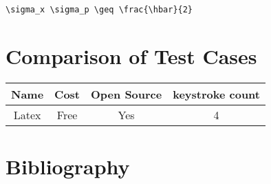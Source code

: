 \documentclass{article}
\begin{document}
\begin{multicols}{2}
\begin{verbatim}
\sigma_x \sigma_p \geq \frac{\hbar}{2}
\end{verbatim}

\section{Comparison of Test Cases}

\begin{tabular}{|c|c|c|c|}\hline
Name & Cost & Open Source & keystroke count \\\hline
Latex & Free & Yes & 4 \\\hline
\end{tabular}

\section{Bibliography}


\end{multicols}
\end{document}
